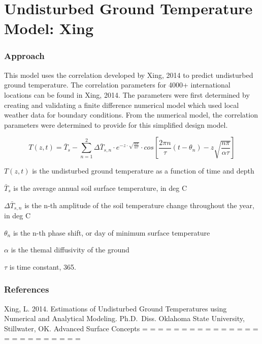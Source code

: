 \section{Undisturbed Ground Temperature Model: Xing}\label{undisturbed-ground-temperature-model-xing}

\subsubsection{Approach}\label{approach-005}

This model uses the correlation developed by Xing, 2014 to predict undisturbed ground temperature. The correlation parameters for 4000+ international locations can be found in Xing, 2014. The parameters were first determined by creating and validating a finite difference numerical model which used local weather data for boundary conditions. From the numerical model, the correlation parameters were determined to provide for this simplified design model.

\begin{equation}
T(z,t) = \bar{T}_{s} - \sum_{n = 1}^{2} \Delta\bar{T}_{s,n} \cdot e^{-z \cdot \sqrt{\frac{n\pi}{\alpha\tau}}} \cdot cos\left[ \frac{2 \pi n}{\tau} \left(t - \theta_{n} \right) - z \sqrt{\frac{n \pi}{\alpha \tau}} \right]
\end{equation}

\(T(z,t)\) is the undisturbed ground temperature as a function of time and depth

\(\bar{T}_{s}\) is the average annual soil surface temperature, in deg C

\(\Delta\bar{T}_{s,n}\) is the n-th amplitude of the soil temperature change throughout the year, in deg C

\(\theta_{n}\) is the n-th phase shift, or day of minimum surface temperature

\(\alpha\) is the themal diffusivity of the ground

\(\tau\) is time constant, 365.

\subsubsection{References}\label{references-050}

Xing, L. 2014. Estimations of Undisturbed Ground Temperatures using Numerical and Analytical Modeling. Ph.D.~Diss. Oklahoma State University, Stillwater, OK. Advanced Surface Concepts = = = = = = = = = = = = = = = = = = = = = = = = =
